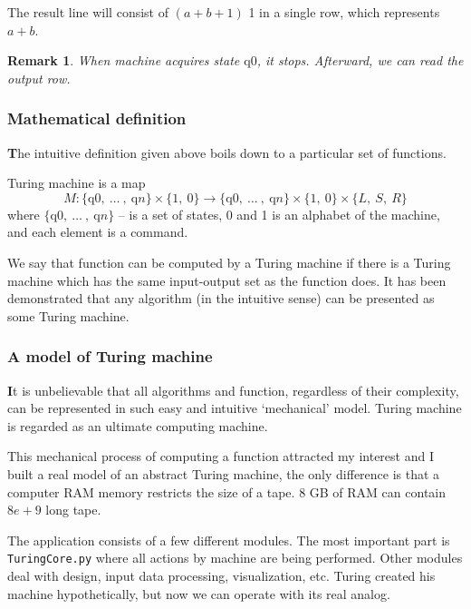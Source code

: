 \documentclass{beamer}
\newtheorem*{remark}{Remark}
\begin{document}
\begin{frame}
The result line will consist of $(a+b+1)$ 1 in a single row, which represents $a+b$.
\begin{remark} When machine acquires state $\mathrm{q}0$, it stops. Afterward, we can read the output row.
\end{remark}
\end{frame}

\begin{frame}
\frametitle{Mathematical definition}
\textbf{\large T}he intuitive definition given above boils down to a particular set of functions. 
\begin{definition}
Turing machine is a map
$$ M:\{\mathrm{q}0,\ \dots\ ,\ \mathrm{q}n\} \times \{ 1,\ 0\} \rightarrow \{\mathrm{q}0,\ \dots\ ,\ \mathrm{q}n\} \times \{ 1,\ 0\} \times \{L,\ S,\ R\}$$
where $\{\mathrm{q}0,\ \dots\ ,\ \mathrm{q}n\}$ -- is a set of states, 0 and 1 is an alphabet of the machine, and each element is a command.
\end{definition}

We say that function can be computed by a Turing machine if there is a Turing machine which has the same input-output set as the function does. It has been demonstrated that any algorithm (in the intuitive sense) can be presented as some Turing machine.
\end{frame}

\begin{frame}

\frametitle{A model of Turing machine}
\textbf{\large I}t is unbelievable that all algorithms and function, regardless of their complexity, can be represented in such easy and intuitive `mechanical' model. Turing machine is regarded as an ultimate computing machine.

This mechanical process of computing a function attracted my interest and I built a real model of an abstract Turing machine, the only difference is that a computer RAM memory restricts the size of a tape. 8 GB of RAM can contain $8e+9$ long tape. 

The application consists of a few different modules. The most important part is \texttt{TuringCore.py} where all actions by machine are being performed. Other modules deal with design, input data processing, visualization, etc. Turing created his machine hypothetically, but now we can operate with its real analog.
\end{frame}
\end{document}
